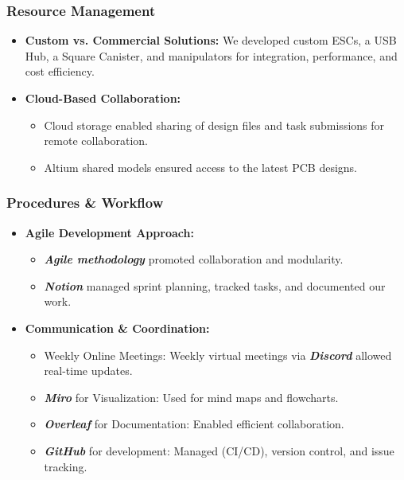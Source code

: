 \subsubsection{Resource Management}

\vspace{-0.5\baselineskip}
\begin{itemize}[leftmargin=0pt, itemindent=20pt]
    \setlength{\itemsep}{0pt}
    \item \textbf{Custom vs. Commercial Solutions:} We developed custom ESCs, a USB Hub, a Square Canister, and manipulators for integration, performance, and cost efficiency.
    \item \textbf{Cloud-Based Collaboration:}
    \vspace{-0.5\baselineskip}
    \begin{itemize}
        \setlength{\itemsep}{0pt}
        \item Cloud storage enabled sharing of design files and task submissions for remote collaboration.
        \item Altium shared models ensured access to the latest PCB designs.
    \end{itemize}
\end{itemize}

\subsubsection{Procedures \& Workflow}

\vspace{-0.5\baselineskip}
\begin{itemize}[leftmargin=0pt, itemindent=20pt]
    \setlength{\itemsep}{0pt}
    \item \textbf{Agile Development Approach:}
    \vspace{-0.5\baselineskip}
    \begin{itemize}[leftmargin=0pt, itemindent=20pt]
        \setlength{\itemsep}{0pt}
        \item \textbf{\textit{Agile methodology}} promoted collaboration and modularity.
        \item \textbf{\textit{Notion}} managed sprint planning, tracked tasks, and documented our work.
    \end{itemize}
    \item \textbf{Communication \& Coordination:}
    \vspace{-0.5\baselineskip}
    \begin{itemize}[leftmargin=0pt, itemindent=20pt]
        \setlength{\itemsep}{0pt}
        \item Weekly Online Meetings: Weekly virtual meetings via \textbf{\textit{Discord}} allowed real-time updates.
        \item \textbf{\textit{Miro}} for Visualization: Used for mind maps and flowcharts. 
        \item \textbf{\textit{Overleaf}} for Documentation: Enabled efficient collaboration.
        \item \textbf{\textit{GitHub}} for development: Managed (CI/CD), version control, and issue tracking.
    \end{itemize}
\end{itemize}

